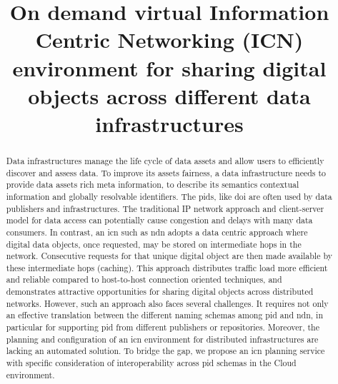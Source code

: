 \documentclass[conference]{IEEEtran}
\begin{document}
\title{On demand virtual Information Centric Networking (ICN) environment for sharing digital objects across different data infrastructures
}

\author{
}

\maketitle

\begin{abstract}
Data infrastructures manage the life cycle of data assets and allow users to efficiently discover and assess data. To improve its assets \gls{fairness}, a data infrastructure needs to provide data assets rich meta information, to describe its semantics contextual information and globally resolvable identifiers. The \glspl{pid}, like \gls{doi} are often used by data publishers and infrastructures. The traditional IP network approach and client-server model for data access can potentially cause congestion and delays with many data consumers. In contrast, an \gls{icn} such as \gls{ndn} adopts a data centric approach where digital data objects, once requested, may be stored on intermediate hops in the network. Consecutive requests for that unique digital object are then made available by these intermediate hops (caching). This approach distributes traffic load more efficient and reliable compared to host-to-host connection oriented techniques, and demonstrates attractive opportunities for sharing digital objects across distributed networks. However, such an approach also faces several challenges. It requires not only an effective translation between the different naming schemas among \gls{pid} and \gls{ndn}, in particular for supporting \gls{pid} from different publishers or repositories. Moreover, the planning and configuration of an \gls{icn} environment for distributed infrastructures are lacking an automated solution. To bridge the gap, we propose an \gls{icn} planning service with specific consideration of interoperability across \gls{pid} schemas in the Cloud environment.


\end{abstract}
\end{document}
